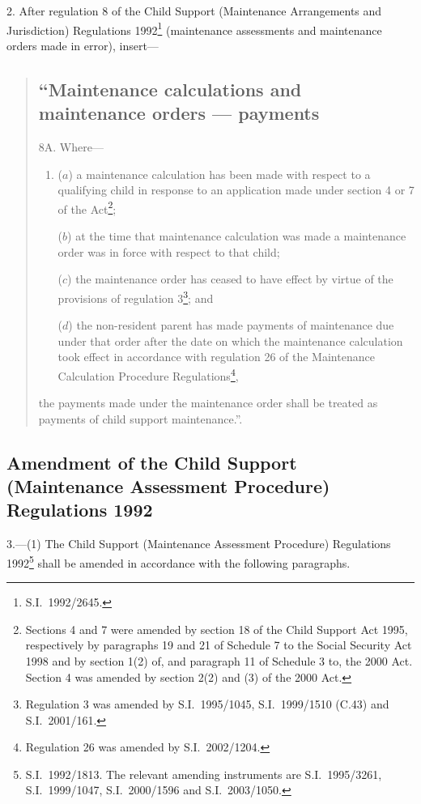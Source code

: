 \documentclass[12pt,a4paper]{article}
\begin{document}
2.  After regulation 8 of the Child Support (Maintenance Arrangements and Jurisdiction) Regulations 1992\footnote{S.I.\ 1992/2645.} (maintenance assessments and maintenance orders made in error), insert—
\begin{quotation}
\subsection*{“Maintenance calculations and maintenance orders --- payments}

8A.  Where—
\begin{enumerate}\item[]
($a$) a maintenance calculation has been made with respect to a qualifying child in response to an application made under section 4 or 7 of the Act\footnote{Sections 4 and 7 were amended by section 18 of the Child Support Act 1995, respectively by paragraphs 19 and 21 of Schedule 7 to the Social Security Act 1998 and by section 1(2) of, and paragraph 11 of Schedule 3 to, the 2000 Act. Section 4 was amended by section 2(2) and (3) of the 2000 Act.};

($b$) at the time that maintenance calculation was made a maintenance order was in force with respect to that child;

($c$) the maintenance order has ceased to have effect by virtue of the provisions of regulation 3\footnote{Regulation 3 was amended by S.I.\ 1995/1045, S.I.\ 1999/1510 (C.43) and S.I.\ 2001/161.}; and

($d$) the non-resident parent has made payments of maintenance due under that order after the date on which the maintenance calculation took effect in accordance with regulation 26 of the Maintenance Calculation Procedure Regulations\footnote{Regulation 26 was amended by S.I.\ 2002/1204.},
\end{enumerate}
the payments made under the maintenance order shall be treated as payments of child support maintenance.”.
\end{quotation}

\subsection[3. Amendment of the Child Support (Maintenance Assessment Procedure) Regulations 1992]{Amendment of the Child Support (Maintenance Assessment Procedure) Regulations 1992}

3.---(1)  The Child Support (Maintenance Assessment Procedure) Regulations 1992\footnote{S.I.\ 1992/1813. The relevant amending instruments are S.I.\ 1995/3261, S.I.\ 1999/1047, S.I.\ 2000/1596 and S.I.\ 2003/1050.} shall be amended in accordance with the following paragraphs.
\end{document}
